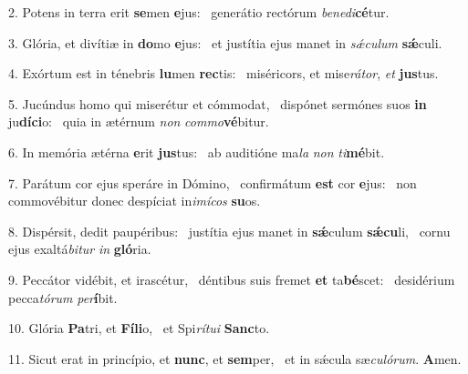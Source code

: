2. Potens in terra erit \textbf{se}men \textbf{e}jus: \ast\  generátio rectórum \textit{be}\textit{ne}\textit{di}\textbf{cé}tur.\

3. Glória, et divítiæ in \textbf{do}mo \textbf{e}jus: \ast\  et justítia ejus manet in \textit{sǽ}\textit{cu}\textit{lum} \textbf{sǽ}culi.\

4. Exórtum est in ténebris \textbf{lu}men \textbf{rec}tis: \ast\  miséricors, et mise\textit{rá}\textit{tor}, \textit{et} \textbf{jus}tus.\

5. Jucúndus homo qui miserétur et cómmodat, \dag\  dispónet sermónes suos \textbf{in} ju\textbf{dí}\textbf{ci}o: \ast\  quia in ætérnum \textit{non} \textit{com}\textit{mo}\textbf{vé}bitur.\

6. In memória ætérna \textbf{e}rit \textbf{jus}tus: \ast\  ab auditióne ma\textit{la} \textit{non} \textit{ti}\textbf{mé}bit.\

7. Parátum cor ejus speráre in Dómino, \dag\  confirmátum \textbf{est} cor \textbf{e}jus: \ast\  non commovébitur donec despíciat in\textit{i}\textit{mí}\textit{cos} \textbf{su}os.\

8. Dispérsit, dedit paupéribus: \dag\  justítia ejus manet in \textbf{sǽ}culum \textbf{sǽ}\textbf{cu}li, \ast\  cornu ejus exaltá\textit{bi}\textit{tur} \textit{in} \textbf{gló}ria.\

9. Peccátor vidébit, et irascétur, \dag\  déntibus suis fremet \textbf{et} ta\textbf{bé}scet: \ast\  desidérium pecca\textit{tó}\textit{rum} \textit{per}\textbf{í}bit.\

10. Glória \textbf{Pa}tri, et \textbf{Fí}\textbf{li}o, \ast\  et Spi\textit{rí}\textit{tu}\textit{i} \textbf{Sanc}to.\

11. Sicut erat in princípio, et \textbf{nunc}, et \textbf{sem}per, \ast\  et in sǽcula sæ\textit{cu}\textit{ló}\textit{rum}. \textbf{A}men.\

